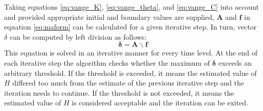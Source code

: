Taking equations \eqref{eq:vange_K}, \eqref{eq:vange_theta}, and \eqref{eq:vange_C} into account and provided appropriate initial and boundary values are supplied, $\mathbf{A}$ and $\mathbf{f}$ in equation \eqref{eq:maform} can be calculated for a given iterative step.  In turn, vector $\delta$ can be computed by left division as follows:
\begin{equation}
  \label{eq:maform_ledi}
  \boldsymbol{\delta} = \mathbf{A \backslash f}
\end{equation}
This equation is solved in an iterative manner for every time level.  At the end of each iterative step the algorithm checks whether the maximum of $\boldsymbol{\delta}$ exceeds an arbitrary threshold.
If the threshold is exceeded, it means the estimated value of $H$ differed too much from the estimate of the previous iterative step and the iteration needs to continue.
If the threshold is not exceeded, it means the estimated value of $H$ is considered acceptable and the iteration can be exited.

